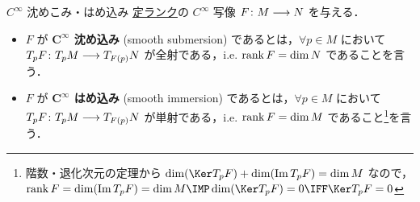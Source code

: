 \documentclass[TQFT_main]{subfiles}
\begin{document}
\begin{mydef}[label=def:submersion-smooth]{$C^\infty$ 沈めこみ・はめ込み}
    \hyperref[def:rank-smooth]{定ランク}の $C^\infty$ 写像 $F \colon M \longrightarrow N$ を与える．
    \begin{itemize}
        \item $F$ が\textbf{ $\bm{C^\infty}$ 沈め込み} (smooth submersion) であるとは，$\forall p \in M$ において $T_p F \colon T_p M \longrightarrow T_{F(p)} N$ が全射である，i.e. $\rank F = \dim N$ であることを言う．
        \item $F$ が\textbf{ $\bm{C^\infty}$ はめ込み} (smooth immersion) であるとは，$\forall p \in M$ において $T_p F \colon T_p M \longrightarrow T_{F(p)} N$ が単射である，i.e. $\rank F = \dim M$ であること\footnote{階数・退化次元の定理から $\dim (\Ker T_p F) + \dim (\Im T_p F) = \dim M$ なので，$\rank F = \dim (\Im T_p F) = \dim M \IMP \dim (\Ker T_p F) = 0 \IFF \Ker T_p F = 0$}を言う．
    \end{itemize}
\end{mydef}
\end{document}

